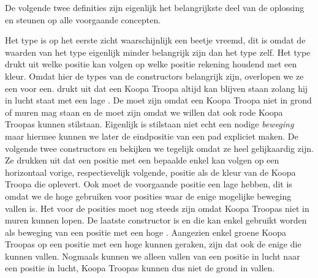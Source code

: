 De volgende twee definities zijn eigenlijk het belangrijkste deel van de
oplossing en steunen op alle voorgaande concepten.


Het  type is op het eerste zicht waarschijnlijk een beetje
vreemd, dit is omdat de waarden van het type eigenlijk minder belangrijk zijn
dan het type zelf. Het type drukt uit welke positie kan volgen op welke positie
rekening houdend met een kleur. Omdat hier de types van de constructors
belangrijk zijn, overlopen we ze een voor een.  drukt uit dat een
Koopa Troopa altijd kan blijven staan zolang hij in lucht staat met een lage
. De  moet  zijn omdat een Koopa
Troopa niet in grond of muren mag staan en de  moet
 zijn omdat we willen dat ook rode Koopa Troopas kunnen stilstaan.
Eigenlijk is stilstaan niet echt een nodige \emph{beweging} maar hiermee kunnen
we later de eindpositie van een pad expliciet maken. De volgende twee
constructors  en  bekijken we tegelijk omdat ze heel
gelijkaardig zijn. Ze drukken uit dat een positie met een bepaalde
 enkel kan volgen op een horizontaal vorige, respectievelijk
volgende, positie als de kleur van de Koopa Troopa die 
oplevert. Ook moet de voorgaande positie een lage  hebben, dit
is omdat we de hoge  gebruiken voor posities waar de enige
mogelijke beweging vallen is. Het  voor de posities moet nog
steeds  zijn omdat Koopa Troopas niet in muren kunnen lopen.  De
laatste constructor is  en die kan enkel gebruikt worden als
beweging van een positie met een hoge . Aangezien enkel groene
Koopa Troopas op een positie met een hoge  kunnen geraken,
zijn dat ook de enige die kunnen vallen. Nogmaals kunnen we alleen vallen van
een positie in lucht naar een positie in lucht, Koopa Troopas kunnen dus niet
de grond in vallen.

